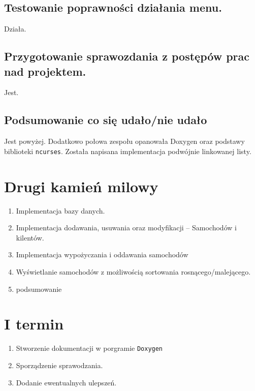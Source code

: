 \documentclass[11pt]{article}
\begin{document}
\subsection{Testowanie poprawności działania menu.}
\label{sec:orgf304710}
Działa.
\subsection{Przygotowanie sprawozdania z postępów prac nad projektem.}
\label{sec:org2331809}
Jest.
\subsection{Podsumowanie co się udało/nie udało}
\label{sec:org614b39f}
Jest powyżej.
Dodatkowo połowa zespołu opanowała Doxygen oraz podstawy biblioteki \texttt{ncurses}.
Została napisana implementacja podwójnie linkowanej listy.
\section{Drugi kamień milowy}
\label{sec:org90a07bf}
\begin{enumerate}
\item Implementacja bazy danych.
\item Implementacja dodawania, usuwania oraz modyfikacji -- Samochodów i kilentów.
\item Implementacja wypożyczania i oddawania samochodów
\item Wyświetlanie samochodów z możliwością sortowania rosnącego/malejącego.
\item podsumowanie
\end{enumerate}
\section{I termin}
\label{sec:org13fc20f}
\begin{enumerate}
\item Stworzenie dokumentacji w porgramie \texttt{Doxygen}
\item Sporządzenie sprawodzania.
\item Dodanie ewentualnych ulepszeń.
\end{enumerate}
\end{document}
